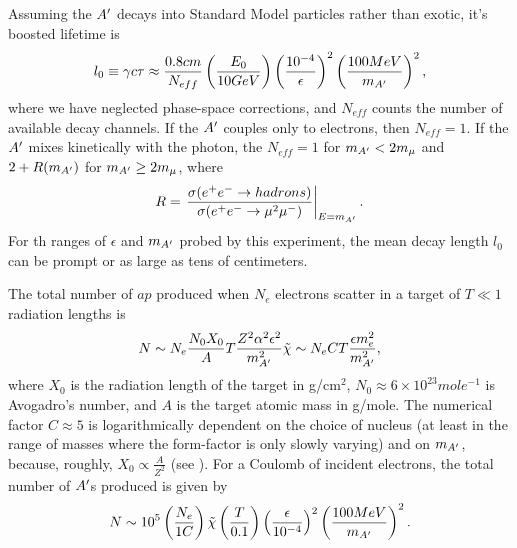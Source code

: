 Assuming the $A^\prime$ decays into Standard Model particles rather than exotic, it's boosted lifetime is
\begin{equation}
l_0 \equiv \gamma c\tau \approx \frac{0.8 cm}{N_{eff}} \left(\frac{E_0}{10 GeV}\right)\left(\frac{10^{-4}}{\epsilon}\right)^2\left(\frac{100 MeV}{m_{A^\prime}}\right)^2,
\end{equation}
where we have neglected phase-space corrections, and $N_{eff}$ counts the number of available decay channels.  If the $A^\prime$ couples only to electrons, then $N_{eff}=1$.  If the $A^\prime$ mixes kinetically with the photon, the $N_{eff}=1$ for $m_{A^\prime} < 2m_\mu$ and $2+R(m_{A^\prime})$ for $m_{A^\prime} \geq 2 m_\mu$, where \cite{eehadrons}
\begin{equation}
R  =\left. \frac{\sigma(e^+e^-\rightarrow hadrons)}{\sigma (e^+e^- \rightarrow \mu^2\mu^-)}\right|_{E=m_{A^\prime}} . 
\end{equation} 
For th ranges of $\epsilon$ and $m_{A^\prime}$ probed by this experiment, the mean decay length $l_0$ can be prompt or as large as tens of centimeters.  

The total number of $ap$ produced when $N_e$ electrons scatter in a target of $T\ll 1 $ radiation lengths is
\begin{equation}
N\sim N_e\frac{N_0 X_0}{A}T\frac{Z^2\alpha^2\epsilon^2}{m_{A^\prime}^2}\tilde{\chi}\sim N_e C T \frac{\epsilon m_e^2}{m_{A^\prime}^2},
\end{equation}
where $X_0$ is the radiation length of the target in g/cm$^2$, $N_0 \approx 6\times 10^{23} mole^{-1}$ is Avogadro's number, and $A$ is the target atomic mass in g/mole.  The numerical factor $C\approx 5$ is logarithmically dependent on the choice of nucleus (at least in the range of masses where the form-factor is only slowly varying) and on $m_{A^\prime}$, because, roughly, $X_0 \propto \frac{A}{Z^2}$ (see \cite{Kim:1973he, Essig:2010xa,Bjorken:2009mm}).  For a Coulomb of incident
electrons, the total number of $A^\prime$s produced is given by
\begin{equation}
N\sim 10^5 \left(\frac{N_e}{1 C}\right)\tilde{\chi}\left(\frac{T}{0.1}\right)\left(\frac{\epsilon}{10^{-4}}\right)^2\left(\frac{100 MeV}{m_{A^\prime}}\right)^2.
\end{equation}

